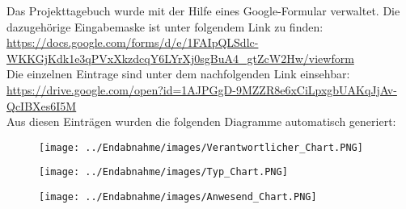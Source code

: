 Das Projekttagebuch wurde mit der Hilfe eines Google-Formular verwaltet. Die dazugehörige Eingabemaske ist unter folgendem Link zu finden: \url{https://docs.google.com/forms/d/e/1FAIpQLSdlc-WKKGjKdk1e3qPVxXkzdcqY6LYrXj0sgBuA4_gtZcW2Hw/viewform}\\
Die einzelnen Eintrage sind unter dem nachfolgenden Link einsehbar: \url{https://drive.google.com/open?id=1AJPGgD-9MZZR8e6xCiLpxgbUAKqJjAv-QcIBXes6I5M}\\
Aus diesen Einträgen wurden die folgenden Diagramme automatisch generiert:

\begin{figure}[H]
    \centering
    \texttt{[image: ../Endabnahme/images/Verantwortlicher\_Chart.PNG]}
\end{figure}

\begin{figure}[H]
    \centering
    \texttt{[image: ../Endabnahme/images/Typ\_Chart.PNG]}
\end{figure}

\begin{figure}[H]
    \centering
    \texttt{[image: ../Endabnahme/images/Anwesend\_Chart.PNG]}
\end{figure}